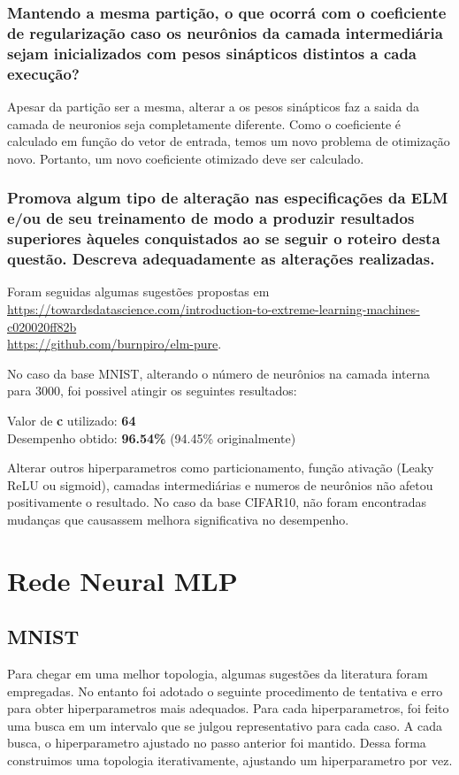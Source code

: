 \documentclass[a4paper]{article}
\begin{document}
\subsubsection{Mantendo a mesma partição, o que ocorrá com o coeficiente de regularização caso os neurônios da
    camada intermediária sejam inicializados com pesos sinápticos distintos a cada execução?}
Apesar da partição ser a mesma, alterar a os pesos sinápticos faz a saida da camada de neuronios seja completamente diferente. Como o coeficiente é calculado em função do vetor de entrada, temos um novo problema de otimização novo. Portanto, um novo coeficiente otimizado deve ser calculado.


\subsubsection{Promova algum tipo de alteração nas especificações da ELM e/ou de seu treinamento de modo a produzir resultados superiores àqueles conquistados ao se seguir o roteiro desta questão. Descreva adequadamente as alterações realizadas.}

Foram seguidas algumas sugestões propostas em \\
\url{https://towardsdatascience.com/introduction-to-extreme-learning-machines-c020020ff82b} \\
\url{https://github.com/burnpiro/elm-pure}.

No caso da base MNIST, alterando o número de neurônios na camada interna para 3000, foi possivel atingir os seguintes resultados:

Valor de \textbf{c} utilizado: \textbf{64} \\
Desempenho obtido: \textbf{96.54\%} (94.45\% originalmente)

Alterar outros hiperparametros como particionamento, função ativação (Leaky ReLU ou sigmoid), camadas intermediárias e numeros de neurônios não afetou positivamente o resultado. No caso da base CIFAR10, não foram encontradas mudanças que causassem melhora significativa no desempenho.

\section{Rede Neural MLP}

\subsection{MNIST}

Para chegar em uma melhor topologia, algumas sugestões da literatura foram empregadas. No entanto foi adotado o seguinte procedimento de tentativa e erro para obter hiperparametros mais adequados. Para cada hiperparametros, foi feito uma busca em um intervalo que se julgou representativo para cada caso. A cada busca, o hiperparametro ajustado no passo anterior foi mantido. Dessa forma construimos uma topologia iterativamente, ajustando um hiperparametro por vez.
\end{document}
